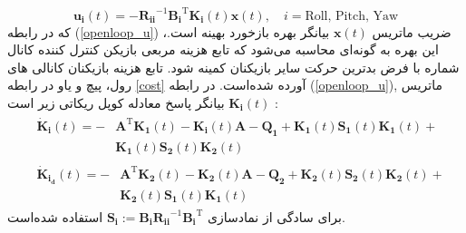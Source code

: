 \documentclass{CCI2020}
\begin{document}
\begin{equation}\label{openloop_u}
	\boldsymbol{u_i}(t) = -\boldsymbol{R_{ii}}^{-1}\boldsymbol{B_i}^\mathrm{T}\boldsymbol{K_{i}}(t)\boldsymbol{x}(t),\quad i = \text{Roll, Pitch, Yaw}
\end{equation}
که در رابطه 
(\ref{openloop_u})
،ضریب ماتریس $\boldsymbol{x}(t)$ بیانگر بهره بازخورد بهینه است. این بهره به گونه‌ای محاسبه می‌شود که تابع هزینه مربعی بازیکن کنترل کننده کانال شماره  با فرض بدترین حرکت سایر بازیکنان کمینه شود. تابع هزینه بازیکنان کانالی های رول، پیچ و یاو در رابطه
\eqref{cost}
آورده شده‌است.
در رابطه 
(\ref{openloop_u}),
ماتریس $\boldsymbol{K_{i}}(t)$ بیانگر پاسخ معادله کوپل ریكاتی
زیر است
\cite{diff_game}:
\begin{equation}\label{coupled_riccatti_LQDG}
	\begin{split}
		&\begin{split}
			 \boldsymbol{\dot{K}_i}(t) = -&\boldsymbol{A}^\mathrm{T}\boldsymbol{K_1}(t) - \boldsymbol{K_i}(t)\boldsymbol{A} - \boldsymbol{Q_1} +\boldsymbol{K_1}(t)\boldsymbol{S_1}(t)\boldsymbol{K_1}(t) + \\ &\boldsymbol{K_1}(t)\boldsymbol{S_2}(t)\boldsymbol{K_2}(t)
		\end{split}\\
		&\begin{split} \boldsymbol{\dot{K}_{i_d}}(t) = 
			-&\boldsymbol{A}^\mathrm{T}\boldsymbol{K_2}(t) - \boldsymbol{K_2}(t)\boldsymbol{A} - \boldsymbol{Q_2} +\boldsymbol{K_2}(t)\boldsymbol{S_2}(t)\boldsymbol{K_2}(t) +\\ &\boldsymbol{K_2}(t)\boldsymbol{S_1}(t)\boldsymbol{K_1}(t)
		\end{split}
	\end{split}
\end{equation}
برای سادگی از نمادسازی
$\boldsymbol{S_i} := \boldsymbol{B_iR_{ii}}^{-1}\boldsymbol{B_i}^\mathrm{T}$
استفاده شده‌است. 
\end{document}

